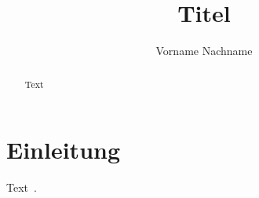 \documentclass[biblatex]{lni}
\begin{document}
\title{Titel}
\author{Vorname Nachname}{}{}
\maketitle
\begin{abstract}
Text
\end{abstract}
\section{Einleitung}
Text~\cite{jabref}.
\printbibliography
\end{document}
